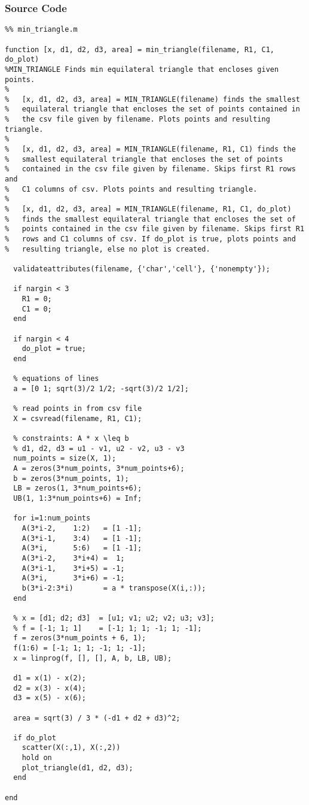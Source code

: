 \documentclass{article}
\begin{document}
\subsubsection{Source Code}
\vspace{0.25in}
\begin{lstlisting}
%% min_triangle.m

function [x, d1, d2, d3, area] = min_triangle(filename, R1, C1, do_plot)
%MIN_TRIANGLE Finds min equilateral triangle that encloses given points.
%
%   [x, d1, d2, d3, area] = MIN_TRIANGLE(filename) finds the smallest
%   equilateral triangle that encloses the set of points contained in 
%   the csv file given by filename. Plots points and resulting triangle.
%
%   [x, d1, d2, d3, area] = MIN_TRIANGLE(filename, R1, C1) finds the 
%	smallest equilateral triangle that encloses the set of points 
%	contained in the csv file given by filename. Skips first R1 rows and
%	C1 columns of csv. Plots points and resulting triangle.
%
%   [x, d1, d2, d3, area] = MIN_TRIANGLE(filename, R1, C1, do_plot) 
%	finds the smallest equilateral triangle that encloses the set of 
%	points contained in the csv file given by filename. Skips first R1 
%	rows and C1 columns of csv. If do_plot is true, plots points and 
%	resulting triangle, else no plot is created.

  validateattributes(filename, {'char','cell'}, {'nonempty'});
  
  if nargin < 3
    R1 = 0;
    C1 = 0;
  end
  
  if nargin < 4
    do_plot = true;
  end
  
  % equations of lines
  a = [0 1; sqrt(3)/2 1/2; -sqrt(3)/2 1/2];
  
  % read points in from csv file
  X = csvread(filename, R1, C1);
  
  % constraints: A * x \leq b
  % d1, d2, d3 = u1 - v1, u2 - v2, u3 - v3
  num_points = size(X, 1);
  A = zeros(3*num_points, 3*num_points+6);
  b = zeros(3*num_points, 1);
  LB = zeros(1, 3*num_points+6);
  UB(1, 1:3*num_points+6) = Inf;
  
  for i=1:num_points
    A(3*i-2,    1:2)   = [1 -1];
    A(3*i-1,    3:4)   = [1 -1];
    A(3*i,      5:6)   = [1 -1];
    A(3*i-2,    3*i+4) =  1;
    A(3*i-1,    3*i+5) = -1;
    A(3*i,      3*i+6) = -1;
    b(3*i-2:3*i)       = a * transpose(X(i,:));
  end
  
  % x = [d1; d2; d3]  = [u1; v1; u2; v2; u3; v3];
  % f = [-1; 1; 1]    = [-1; 1; 1; -1; 1; -1];
  f = zeros(3*num_points + 6, 1);
  f(1:6) = [-1; 1; 1; -1; 1; -1];
  x = linprog(f, [], [], A, b, LB, UB);
  
  d1 = x(1) - x(2);
  d2 = x(3) - x(4);
  d3 = x(5) - x(6);
  
  area = sqrt(3) / 3 * (-d1 + d2 + d3)^2;
  
  if do_plot
    scatter(X(:,1), X(:,2))
    hold on
    plot_triangle(d1, d2, d3);
  end

end
\end{lstlisting}
\end{document}
